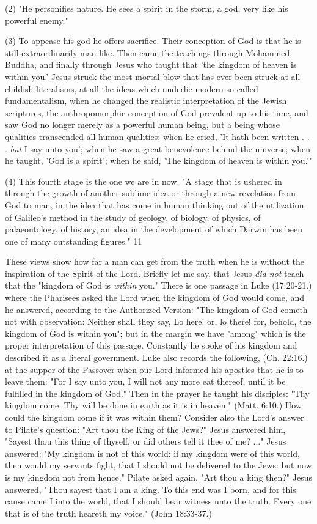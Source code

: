 (2) "He personifies nature. He sees a spirit in the storm, a god, very like his powerful
enemy."

(3) To appease his god he offers sacrifice. Their conception of God is that he is still
extraordinarily man-like. Then came the teachings through Mohammed, Buddha, and finally
through Jesus who taught that 'the kingdom of heaven is within you.' Jesus struck the most
mortal blow that has ever been struck at all childish literalisms, at all the ideas which
underlie modern so-called fundamentalism, when he changed the realistic interpretation of
the Jewish scriptures, the anthropomorphic conception of God prevalent up to his time, and
saw God no longer merely as a powerful human being, but a being whose qualities
transcended all human qualities; when he cried, 'It hath been written . . . \textit{but} I say unto you';
when he saw a great benevolence behind the universe; when he taught, 'God is a spirit'; when
he said, 'The kingdom of heaven is within you.'"

(4) This fourth stage is the one we are in now. "A stage that is ushered in through the growth
of another sublime idea or through a new revelation from God to man, in the idea that has
come in human thinking out of the utilization of Galileo's method in the study of geology, of
biology, of physics, of palaeontology, of history, an idea in the development of which
Darwin has been one of many outstanding figures." 11

These views show how far a man can get from the truth when he is without the inspiration of
the Spirit of the Lord. Briefly let me say, that Jesus \textit{did not} teach that the "kingdom of God is
\textit{within} you." There is one passage in Luke (17:20-21.) where the Pharisees asked the Lord
when the kingdom of God would come, and he answered, according to the Authorized
Version: "The kingdom of God cometh not with observation: Neither shall they say, Lo here!
or, lo there! for, behold, the kingdom of God is within you"; but in the margin we have
"among" which is the proper interpretation of this passage. Constantly he spoke of his
kingdom and described it as a literal government. Luke also records the following, (Ch.
22:16.) at the supper of the Passover when our Lord informed his apostles that he is to leave
them: "For I say unto you, I will not any more eat thereof, until it be fulfilled in the kingdom
of God." Then in the prayer he taught his disciples: "Thy kingdom come. Thy will be done in
earth as it is in heaven." (Matt. 6:10.) How could the kingdom come if it was within them?
Consider also the Lord's answer to Pilate's question: "Art thou the King of the Jews?" Jesus
answered him, "Sayest thou this thing of thyself, or did others tell it thee of me? ..." Jesus
answered: "My kingdom is not of this world: if my kingdom were of this world, then would
my servants fight, that I should not be delivered to the Jews: but now is my kingdom not
from hence." Pilate asked again, "Art thou a king then?" Jesus answered, "Thou sayest that I
am a king. To this end was I born, and for this cause came I into the world, that I should bear
witness unto the truth. Every one that is of the truth heareth my voice." (John 18:33-37.)

